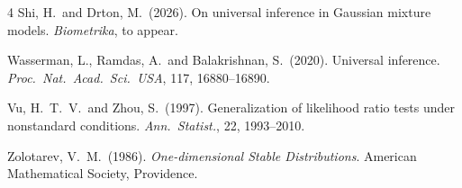 \documentclass[11pt]{article}
\theoremstyle{definition}
\begin{document}
\begin{thebibliography}{4}
	Shi, H.~and Drton, M.~(2026).
	On universal inference in Gaussian mixture models.
	\textit{Biometrika}, to appear.
	
	
	Wasserman, L., Ramdas, A.~and Balakrishnan, S.~(2020).
	Universal inference.
	\textit{Proc.~Nat.~Acad.~Sci.~USA}, 117, 16880--16890.
	
	Vu, H.~T.~V.~and Zhou, S.~(1997).
	Generalization of likelihood ratio tests under nonstandard conditions.	
	\textit{Ann.~Statist.}, 22, 1993--2010.
	
	Zolotarev, V.~M.~(1986).
	\textit{One-dimensional Stable Distributions}. American Mathematical Society, Providence.
	
	
\end{thebibliography}

\bigskip
\bigskip
\end{document}
